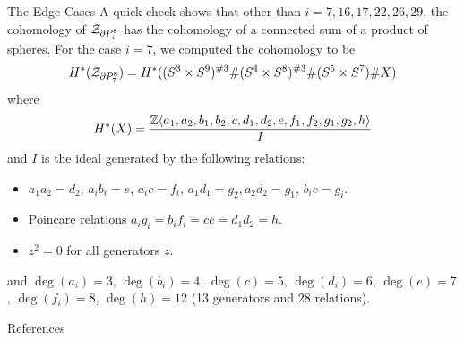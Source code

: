 \documentclass[final]{beamer}
\begin{document}
\begin{frame}[t]
\begin{columns}[t]
\begin{column}{\colwidth}
  \begin{exampleblock}{The Edge Cases}
A quick check shows that other than $i=7,16,17,22,26,29$, the cohomology of $\mathcal{Z}_{\partial P_i^8}$ has the cohomology of a connected sum of a product of spheres. For the case $i=7$, we computed the cohomology to be $$H^\ast(\mathcal{Z}_{\partial P_7^8})=H^\ast((S^3\times S^9)^{\#3}\#(S^4\times S^8)^{\#3}\#(S^5\times S^7)\# X)$$ where $$H^\ast(X)=\frac{\mathbb{Z}\langle a_1,a_2,b_1,b_2,c,d_1,d_2,e,f_1,f_2,g_1,g_2,h\rangle}{I}$$ and $I$ is the ideal generated by the following relations: 
\begin{itemize}
\item $a_1a_2=d_2$, $a_ib_i=e$, $a_ic=f_i$, $a_1d_1=g_2,a_2d_2=g_1$, $b_ic=g_i$. 
\item Poincare relations $a_ig_i=b_if_i=ce=d_1d_2=h$. 
\item $z^2=0$ for all generators $z$. 
\end{itemize}
and $\deg(a_i)=3$, $\deg(b_i)=4$, $\deg(c)=5$, $\deg(d_i)=6$, $\deg(e)=7$, $\deg(f_i)=8$, $\deg(h)=12$ (13 generators and 28 relations). 
  \end{exampleblock}

  \begin{block}{References}
    \nocite{*}
    \footnotesize{}
  \end{block}

\end{column}

\separatorcolumn
\end{columns}
\end{frame}
\end{document}
